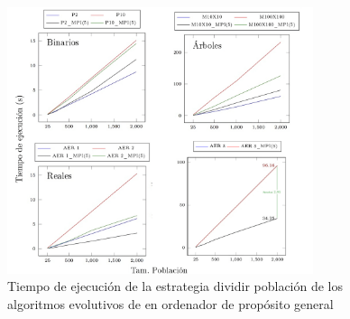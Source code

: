 		\begin{figure}[!h]
			\centering
			\includegraphics[width=0.80\textwidth]{images/chapter_4/pev_1_1mpi}
			\caption{Tiempo de ejecución de la estrategia dividir población de los algoritmos evolutivos de en ordenador de propósito general}
			\label{fig:pev_mpi1_1}			
		\end{figure}
		\newpage

